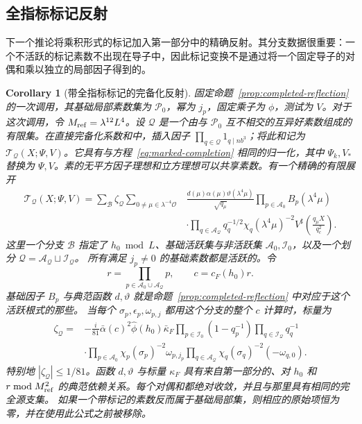\documentclass[11pt,a4paper]{article}
\numberwithin{equation}{section}
\numberwithin{figure}{section}
\newtheorem{corollary}[theorem]{Corollary}
\theoremstyle{definition}
\theoremstyle{remark}
\begin{document}
\subsection{全指标标记反射}\label{par:reflection-marks}

下一个推论将乘积形式的标记加入第一部分中的精确反射。其分支数据很重要：一个不活跃的标记素数不出现在导子中，因此标记变换不是通过将一个固定导子的对偶和乘以独立的局部因子得到的。

\begin{corollary}[带全指标标记的完备化反射]
\label{cor:marked-reflection}
固定命题~\ref{prop:completed-reflection} 的一次调用，其基础局部素数集为 \(\mathcal P_0\)，幂为 \(j_p\)，固定乘子为 \(\phi\)，测试为 \(V\)。对于这次调用，令 \(M_{\rm ref}=\lambda^{12}L^4\)。设 \(\mathcal Q\) 是一个由与 \(\mathcal P_0\) 互不相交的互异好素数组成的有限集。在直接完备化系数和中，插入因子 \(\prod_{q\in\mathcal Q}1_{q\mid nb^3}\)；将此和记为 \(\mathcal T_{\mathcal Q}(X;\Psi,V)\)。它具有与方程~\eqref{eq:marked-completion} 相同的归一化，其中 \(\Psi_k,V_*\) 替换为 \(\Psi,V\)。素的无平方因子理想和立方理想可以共享素数。有一个精确的有限展开
\begin{equation}\label{eq:marked-reflection}
 \begin{split}
 \mathcal T_{\mathcal Q}(X;\Psi,V)
 =\sum_{\mathcal B}\zeta_{\mathcal Q}
 \sum_{0\ne\mu\in\lambda^{-4}\mathcal O}
 &\frac{d(\mu)\alpha(\mu)\vartheta(\lambda^4\mu)}{\sqrt{q_\mu}}
 \prod_{p\in\mathcal A_0}B_p(\lambda^4\mu)\\
 &\cdot\prod_{q\in\mathcal A_{\mathcal Q}}
       q_q^{-1/2}\chi_q(\lambda^4\mu)^{-2}
 V^\sharp\!\left(\frac{q_\mu X}{q_c^2}\right).
 \end{split}
\end{equation}
这里一个分支 \(\mathcal B\) 指定了 \(h_0\bmod L\)、基础活跃集与非活跃集 \(\mathcal A_0,\mathcal I_0\)，以及一个划分
\(\mathcal Q=\mathcal A_{\mathcal Q}\sqcup\mathcal I_{\mathcal Q}\)。
所有满足 \(j_p\ne0\) 的基础素数都是活跃的。令
\[
 r=\prod_{p\in\mathcal A_0\cup\mathcal A_{\mathcal Q}}p,
 \qquad c=c_F(h_0)r.
\]
基础因子 \(B_p\) 与典范函数 \(d,\vartheta\) 就是命题~\ref{prop:completed-reflection} 中对应于这个活跃根式的那些。
当每个 \(\sigma_p,\epsilon_p,\omega_{p,j}\) 都用这个分支的整个 \(c\) 计算时，标量为
\begin{equation}\label{eq:marked-reflection-phase}
 \begin{split}
 \zeta_{\mathcal Q}={}&-\frac{i}{81}\bar\alpha(c)^2
       \widehat\phi(h_0)\bar\kappa_F
       \prod_{p\in\mathcal I_0}(1-q_p^{-1})
       \prod_{q\in\mathcal I_{\mathcal Q}}q_q^{-1}\\
 &\cdot\prod_{p\in\mathcal A_0}\chi_p(\sigma_p)^{-2}\omega_{p,j_p}
       \prod_{q\in\mathcal A_{\mathcal Q}}
             \chi_q(\sigma_q)^{-2}(-\omega_{q,0}).
 \end{split}
\end{equation}
特别地 \(|\zeta_{\mathcal Q}|\le1/81\)。函数
\(d,\vartheta\) 与标量 \(\kappa_F\) 具有来自第一部分的、对 \(h_0\) 和 \(r\bmod M_{\rm ref}^2\) 的典范依赖关系。每个对偶和都绝对收敛，并且与那里具有相同的完全源支集。
如果一个带标记的素数反而属于基础局部集，则相应的原始项恒为零，并在使用此公式之前被移除。
\end{corollary}
\end{document}
